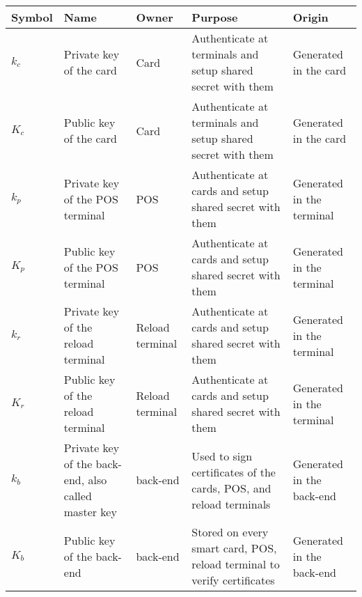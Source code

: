 \begin{tabular}{|l|p{2cm}|p{1.5cm}|p{4.7cm}|p{2.7cm}|}
\hline
    Symbol & Name & Owner & Purpose & Origin \\
\hline
    $k_c$ & Private key of the card & Card & Authenticate at terminals and setup shared secret with them & Generated in the card \\
\hline
    $K_c$ & Public key of the card & Card & Authenticate at terminals and setup shared secret with them & Generated in the card \\
\hline
    $k_p$ & Private key of the POS terminal & POS & Authenticate at cards and setup shared secret with them & Generated in the terminal \\
\hline
    $K_p$ & Public key of the POS terminal & POS & Authenticate at cards and setup shared secret with them & Generated in the terminal \\
\hline  
    $k_r$ & Private key of the reload terminal & Reload terminal & Authenticate at cards and setup shared secret with them & Generated in the terminal \\
\hline
    $K_r$ & Public key of the reload terminal & Reload terminal & Authenticate at cards and setup shared secret with them & Generated in the terminal \\
\hline
    $k_b$ & Private key of the back-end, also called master key & back-end & Used to sign certificates of the cards, POS, and reload terminals & Generated in the back-end \\
\hline
    $K_b$ & Public key of the back-end & back-end & Stored on every smart card, POS, reload terminal to verify certificates & Generated in the back-end \\
\hline
\end{tabular}